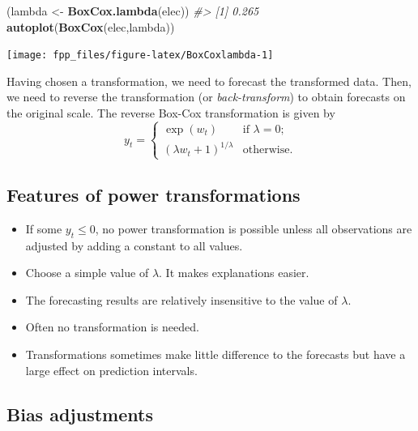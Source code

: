 \documentclass[]{book}
\newenvironment{Shaded}{\begin{snugshade}}{\end{snugshade}}
\newcommand{\CommentTok}[1]{\textcolor[rgb]{0.56,0.35,0.01}{\textit{#1}}}
\newcommand{\KeywordTok}[1]{\textcolor[rgb]{0.13,0.29,0.53}{\textbf{#1}}}
\newcommand{\NormalTok}[1]{#1}
\newcommand{\StringTok}[1]{\textcolor[rgb]{0.31,0.60,0.02}{#1}}
\providecommand{\tightlist}{%
  \setlength{\itemsep}{0pt}\setlength{\parskip}{0pt}}
\begin{document}
\begin{Shaded}
\begin{Highlighting}[]
\NormalTok{(lambda <-}\StringTok{ }\KeywordTok{BoxCox.lambda}\NormalTok{(elec))}
\CommentTok{#> [1] 0.265}
\KeywordTok{autoplot}\NormalTok{(}\KeywordTok{BoxCox}\NormalTok{(elec,lambda))}
\end{Highlighting}
\end{Shaded}

\begin{center}\texttt{[image: fpp\_files/figure-latex/BoxCoxlambda-1]} \end{center}

Having chosen a transformation, we need to forecast the transformed data. Then, we need to reverse the transformation (or \emph{back-transform}) to obtain forecasts on the original scale. The reverse Box-Cox transformation is given by
\begin{equation}
\label{eq:backtransform}
  y_{t} =
    \begin{cases}
      \exp(w_{t}) & \text{if $\lambda=0$};\\
      (\lambda w_t+1)^{1/\lambda} & \text{otherwise}.
    \end{cases}
\end{equation}

\hypertarget{features-of-power-transformations}{%
\subsection*{Features of power transformations}\label{features-of-power-transformations}}

\begin{itemize}
\tightlist
\item
  If some \(y_{t}\le0\), no power transformation is possible unless all observations are adjusted by adding a constant to all values.
\item
  Choose a simple value of \(\lambda\). It makes explanations easier.
\item
  The forecasting results are relatively insensitive to the value of \(\lambda\).
\item
  Often no transformation is needed.
\item
  Transformations sometimes make little difference to the forecasts but have a large effect on prediction intervals.
\end{itemize}

\hypertarget{bias-adjustments}{%
\subsection*{Bias adjustments}\label{bias-adjustments}}
\end{document}
